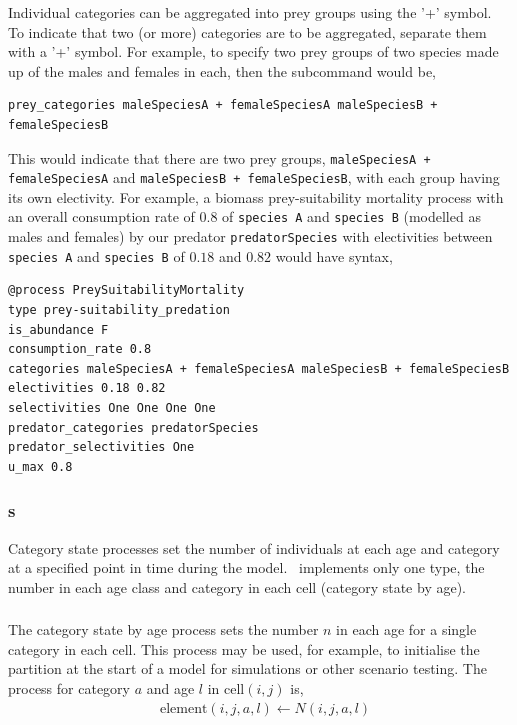 Individual categories can be aggregated into prey groups using the '+' symbol. To indicate that two (or more) categories are to be aggregated, separate them with a '+' symbol. For example, to specify two prey groups of two species made up of the males and females in each, then the subcommand would be,

{\small{\begin{verbatim}
prey_categories maleSpeciesA + femaleSpeciesA maleSpeciesB + femaleSpeciesB
\end{verbatim}}}

This would indicate that there are two prey groups, \texttt{maleSpeciesA + femaleSpeciesA} and \texttt{maleSpeciesB + femaleSpeciesB}, with each group having its own electivity. For example, a biomass prey-suitability mortality process with an overall consumption rate of $0.8$ of \texttt{species A} and \texttt{species B} (modelled as males and females) by our predator \texttt{predatorSpecies} with electivities between \texttt{species A} and \texttt{species B} of $0.18$ and $0.82$ would have syntax,

{\small{\begin{verbatim}
@process PreySuitabilityMortality
type prey-suitability_predation
is_abundance F
consumption_rate 0.8
categories maleSpeciesA + femaleSpeciesA maleSpeciesB + femaleSpeciesB
electivities 0.18 0.82
selectivities One One One One
predator_categories predatorSpecies
predator_selectivities One
u_max 0.8
\end{verbatim}}}

\subsubsection{s}

Category state processes set the number of individuals at each age and category at a specified point in time during the model. \SPM\ implements only one type, the number in each age class and category in each cell (category state by age).

\subsubsection*{}

The category state by age process sets the number $n$ in each age for a single category in each cell. This process may be used, for example, to initialise the partition at the start of a model for simulations or other scenario testing. The process for category $a$ and age $l$ in cell$(i,j)$ is,
\begin{equation}\begin{split}
  & \text{element}(i,j,a,l) \leftarrow N(i,j,a,l)
\end{split}\end{equation}

